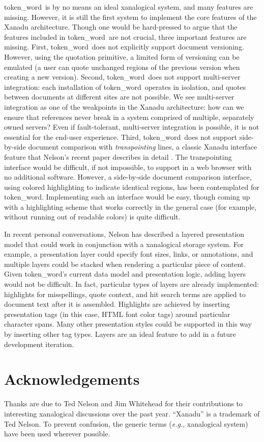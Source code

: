 \documentclass{acm_proc_article-sp}
\newcommand{\tokenWord}{token\_word}
\begin{document}
\tokenWord \  is by no means an ideal xanalogical system, and many features are missing.
However, it is still the first system to implement the core features of the Xanadu architecture.
Though one would be hard-pressed to argue that the features included in \tokenWord \  are not crucial, three important features are missing.
First, \tokenWord \  does not explicitly support document versioning.
However, using the quotation primitive, a limited form of versioning can be emulated (a user can quote unchanged regions of the previous version when creating a new version).
Second, \tokenWord \  does not support multi-server integration:  each installation of \tokenWord \  operates in isolation, and quotes between documents at different sites are not possible.
We see multi-server integration as one of the weakpoints in the Xanadu architecture:  how can we ensure that references never break in a system comprised of multiple, separately owned servers?
Even if fault-tolerant, multi-server integration is possible, it is not essential for the end-user experience. 
Third, \tokenWord \   does not support side-by-side document comparison with \textit{transpointing} lines, a classic Xanadu interface feature that Nelson's recent paper describes in detail \cite{Nelson1999}.
The transpointing interface would be difficult, if not impossible, to support in a web browser with no additional software.
However, a side-by-side document comparison interface, using colored highlighting to indicate identical regions, has been contemplated for \tokenWord.
Implementing such an interface would be easy, though coming up with a highlighting scheme that works correctly in the general case (for example, without running out of readable colors) is quite difficult.

In recent personal conversations, Nelson has described a layered presentation model that could work in conjunction with a xanalogical storage system.
For example, a presentation layer could specify font sizes, links, or annotations, and multiple layers could be stacked when rendering a particular piece of content.
Given \tokenWord's current data model and presentation logic, adding layers would not be difficult.
In fact, particular types of layers are already implemented:  highlights for misspellings, quote context, and hit search terms are applied to document text after it is assembled.
Highlights are achieved by inserting presentation tags (in this case, HTML font color tags) around particular character spans.
Many other presentation styles could be supported in this way by inserting other tag types.
Layers are an ideal feature to add in a future development iteration.

\section{Acknowledgements}
Thanks are due to Ted Nelson and Jim Whitehead for their contributions to interesting xanalogical discussions over the past year. ``Xanadu'' is a trademark of Ted Nelson.  To prevent confusion, the generic terms (\textit{e.g.}, xanalogical system) have been used wherever possible.



\end{document}
